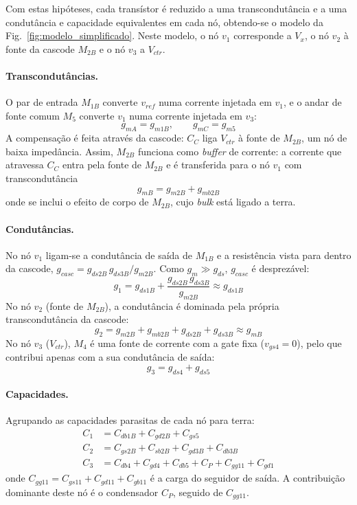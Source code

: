 Com estas hipóteses, cada transístor é reduzido a uma transcondutância e a uma condutância e capacidade equivalentes em cada nó, obtendo-se o modelo da
Fig.~\ref{fig:modelo_simplificado}. Neste modelo, o nó $v_1$ corresponde a $V_x$, o nó $v_2$ à fonte da cascode $M_{2B}$ e o nó $v_3$ a $V_{ctr}$.


\paragraph{Transcondutâncias.}
O par de entrada $M_{1B}$ converte $v_{ref}$ numa corrente injetada em $v_1$, e o andar de fonte comum $M_5$ converte $v_1$ numa corrente injetada em $v_3$:
\begin{equation}
    g_{mA} = g_{m1B}, \qquad g_{mC} = g_{m5}
\end{equation}
A compensação é feita através da cascode: $C_C$ liga $V_{ctr}$ à fonte de $M_{2B}$, um nó de baixa impedância. Assim, $M_{2B}$ funciona como \textit{buffer} de corrente: a corrente que atravessa $C_C$ entra pela fonte de $M_{2B}$ e é transferida para o nó $v_1$ com transcondutância
\begin{equation}
    g_{mB} = g_{m2B} + g_{mb2B}
\end{equation}
onde se inclui o efeito de corpo de $M_{2B}$, cujo \textit{bulk} está ligado a terra.

\paragraph{Condutâncias.}
No nó $v_1$ ligam-se a condutância de saída de $M_{1B}$ e a resistência vista para dentro da cascode, $g_{casc} = g_{ds2B}\,g_{ds3B}/g_{m2B}$. Como $g_m \gg g_{ds}$, $g_{casc}$ é desprezável:
\begin{equation}
    g_1 = g_{ds1B} + \frac{g_{ds2B}\,g_{ds3B}}{g_{m2B}} \approx g_{ds1B}
\end{equation}
No nó $v_2$ (fonte de $M_{2B}$), a condutância é dominada pela própria transcondutância da cascode:
\begin{equation}
    g_2 = g_{m2B} + g_{mb2B} + g_{ds2B} + g_{ds3B} \approx g_{mB}
\end{equation}
No nó $v_3$ ($V_{ctr}$), $M_4$ é uma fonte de corrente com a gate fixa ($v_{gs4} = 0$), pelo que contribui apenas com a sua condutância de saída:
\begin{equation}
    g_3 = g_{ds4} + g_{ds5}
\end{equation}

\paragraph{Capacidades.}
Agrupando as capacidades parasitas de cada nó para terra:
\begin{align}
    C_1 &= C_{db1B} + C_{gd2B} + C_{gs5} \\
    C_2 &= C_{gs2B} + C_{sb2B} + C_{gd3B} + C_{db3B} \\
    C_3 &= C_{db4} + C_{gd4} + C_{db5} + C_P + C_{gg11} + C_{gd1}
\end{align}
onde $C_{gg11} = C_{gs11} + C_{gd11} + C_{gb11}$ é a carga do seguidor de saída. A contribuição dominante deste nó é
o condensador $C_P$, seguido de $C_{gg11}$.

